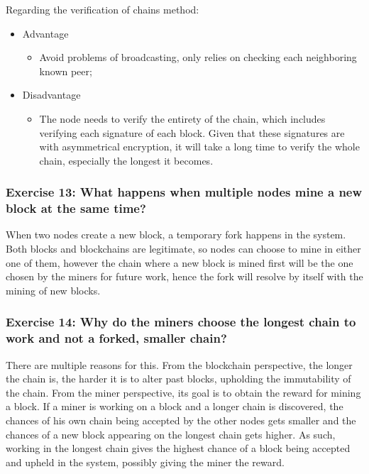 \documentclass[12pt,a4paper]{article}
\begin{document}
Regarding the verification of chains method:
\begin{itemize}
    \item Advantage
    \begin{itemize}
        \item Avoid problems of broadcasting, only relies on checking each neighboring known peer;
    \end{itemize}
    \item Disadvantage
    \begin{itemize}
        \item The node needs to verify the entirety of the chain, which includes verifying each signature of each block. Given that these signatures are with asymmetrical encryption, it will take a long time to verify the whole chain, especially the longest it becomes.
    \end{itemize}
\end{itemize}

\subsubsection*{Exercise 13: What happens when multiple nodes mine a new block at the same time?}

When two nodes create a new block, a temporary fork happens in the system. Both blocks and blockchains are legitimate, so nodes can choose to mine in either one of them, however the chain where a new block is mined first will be the one chosen by the miners for future work, hence the fork will resolve by itself with the mining of new blocks.

\subsubsection*{Exercise 14: Why do the miners choose the longest chain to work and not a forked, smaller chain?}

There are multiple reasons for this. From the blockchain perspective, the longer the chain is, the harder it is to alter past blocks, upholding the immutability of the chain. From the miner perspective, its goal is to obtain the reward for mining a block. If a miner is working on a block and a longer chain is discovered, the chances of his own chain being accepted by the other nodes gets smaller and the chances of a new block appearing on the longest chain gets higher. As such, working in the longest chain gives the highest chance of a block being accepted and upheld in the system, possibly giving the miner the reward.
\end{document}
